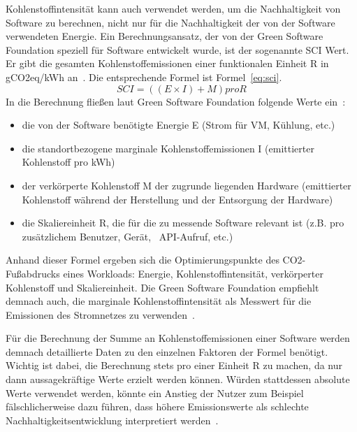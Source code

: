 Kohlenstoffintensität kann auch verwendet werden, um die Nachhaltigkeit von Software zu berechnen, nicht nur für die Nachhaltigkeit der von der Software verwendeten Energie.
Ein Berechnungsansatz, der von der Green Software Foundation speziell für Software entwickelt wurde, ist der sogenannte \ac{SCI} Wert.
Er gibt die gesamten Kohlenstoffemissionen einer funktionalen Einheit R in g\ac{CO2}eq/\ac{kWh} an~\cite{GreenSoftwareFoundation.2022}.
Die entsprechende Formel ist Formel~\ref{eq:sci}.
\begin{equation}
 \label{eq:sci}
 SCI = ((E \times I) + M) pro R
\end{equation}
In die Berechnung fließen laut Green Software Foundation folgende Werte ein~\cite{GreenSoftwareFoundation.2022}:
\begin{itemize}
 \item die von der Software benötigte Energie E (Strom für \ac{VM}, Kühlung, etc.)
 \item die standortbezogene marginale Kohlenstoffemissionen I (emittierter Kohlenstoff pro \ac{kWh})
 \item der verkörperte Kohlenstoff M der zugrunde liegenden Hardware (emittierter Kohlenstoff während der Herstellung und der Entsorgung der Hardware)
 \item die Skaliereinheit R, die für die zu messende Software relevant ist (z.B. pro zusätzlichem Benutzer, Gerät, ~\ac{API}-Aufruf, etc.)
\end{itemize}
Anhand dieser Formel ergeben sich die Optimierungspunkte des \ac{CO2}-Fußabdrucks eines Workloads: Energie, Kohlenstoffintensität, verkörperter Kohlenstoff und Skaliereinheit.
Die Green Software Foundation empfiehlt demnach auch, die marginale Kohlenstoffintensität als Messwert für die Emissionen des Stromnetzes zu verwenden~\cite{GreenSoftwareFoundation.2022b}.

Für die Berechnung der Summe an Kohlenstoffemissionen einer Software werden demnach detaillierte Daten zu den einzelnen Faktoren der Formel benötigt.
Wichtig ist dabei, die Berechnung stets pro einer Einheit R zu machen, da nur dann aussagekräftige Werte erzielt werden können.
Würden stattdessen absolute Werte verwendet werden, könnte ein Anstieg der Nutzer zum Beispiel fälschlicherweise dazu führen, dass höhere Emissionswerte als schlechte Nachhaltigkeitsentwicklung interpretiert werden~\cite{GreenSoftwareFoundation.2022}.

